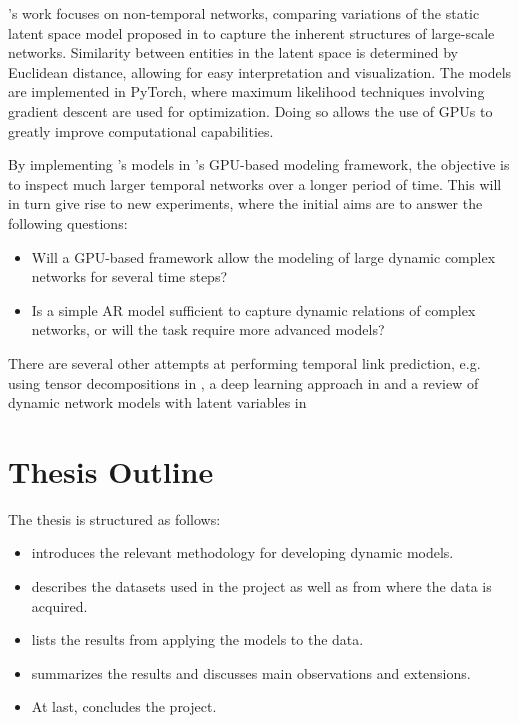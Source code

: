     \citeauthor{jacobsen2018a}'s work focuses on non-temporal networks, comparing variations of the static latent space model proposed in \cite{hoff2002latent} to capture the inherent structures of large-scale networks. 
    Similarity between entities in the latent space is determined by Euclidean distance, allowing for easy interpretation and visualization.
    The models are implemented in PyTorch, where maximum likelihood techniques involving gradient descent are used for optimization. Doing so allows the use of GPUs to greatly improve computational capabilities.
    
    By implementing \citeauthor{zangenberg2018a}'s models in \citeauthor{jacobsen2018a}'s GPU-based modeling framework, the objective is to inspect much larger temporal networks over a longer period of time. This will in turn give rise to new experiments, where the initial aims are to answer the following questions:
    \begin{itemize}\itshape
        \item Will a GPU-based framework allow the modeling of large dynamic complex networks for several time steps?
        \item Is a simple AR model sufficient to capture dynamic relations of complex networks, or will the task require more advanced models?
    \end{itemize}
    
    There are several other attempts at performing temporal link prediction, e.g. using tensor decompositions in \cite{dunlavy2011temporal}, a deep learning approach in \cite{li2014deep} and a review of dynamic network models with latent variables in \cite{kim2018review}
    
\section{Thesis Outline}

    The thesis is structured as follows:
    \begin{itemize}
        \item {} introduces the relevant methodology for developing dynamic models.
        \item {} describes the datasets used in the project as well as from where the data is acquired.
        \item {} lists the results from applying the models to the data.
        \item {} summarizes the results and discusses main observations and extensions.
        \item At last,  concludes the project.
    \end{itemize}